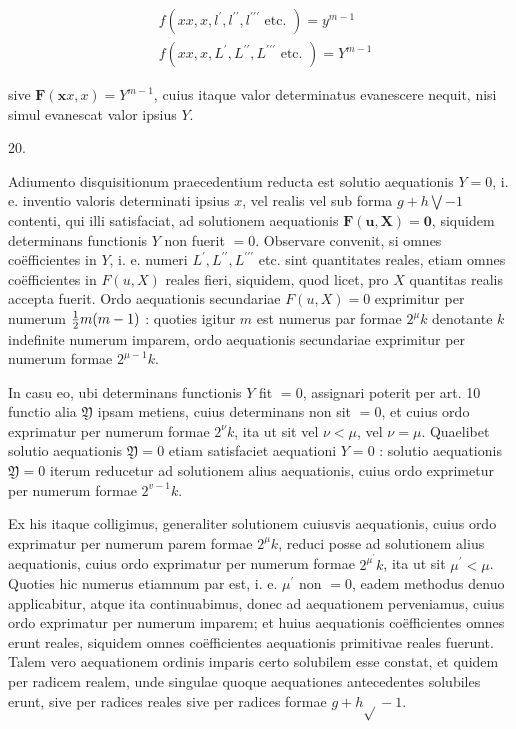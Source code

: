 \documentclass[twoside,12pt, showframe]{memoir}
\let\oldfrac\frac
\def\frac#1#2{\mathchoice{\tfrac{#1}{#2}}{\oldfrac{#1}{#2}}{\genfrac{}{}{}{2}{#1}{#2\mathstrut}}{\genfrac{}{}{}{3}{#1}{#2\mathstrut}}}
\begin{document}
\[
\begin{aligned}
& f\left(x x, x, l^{\prime}, l^{\prime \prime}, l^{\prime \prime \prime} \text { etc. }\right)=y^{m-1} \\
& f\left(x x, x, L^{\prime}, L^{\prime \prime}, L^{\prime \prime \prime} \text { etc. }\right)=Y^{m-1}
\end{aligned}
\]

sive \(\boldsymbol{F}(\boldsymbol{x} x, x)=Y^{m-1}\), cuius itaque valor determinatus evanescere nequit, nisi simul evanescat valor ipsius \(Y\).

20.

Adiumento disquisitionum praecedentium reducta est solutio aequationis \(Y=0\), i. e. inventio valoris determinati ipsius \(x\), vel realis vel sub forma \(g+h \bigvee-1\) contenti, qui illi satisfaciat, ad solutionem aequationis \(\boldsymbol{F}(\boldsymbol{u}, \mathbf{X})=\mathbf{0}\),
siquidem determinans functionis \(Y\) non fuerit \(=0\). Observare convenit, si omnes coëfficientes in \(Y\), i. e. numeri \(L^{\prime}, L^{\prime \prime}, L^{\prime \prime \prime}\) etc. sint quantitates reales, etiam omnes coëfficientes in \(F(u, X)\) reales fieri, siquidem, quod licet, pro \(X\) quantitas realis accepta fuerit. Ordo aequationis secundariae \(F(u, X)=0\) exprimitur per numerum \(\frac{1}{2} m(m-1)\) : quoties igitur \(m\) est numerus par formae \(2^{\mu} k\) denotante \(k\) indefinite numerum imparem, ordo aequationis secundariae exprimitur per numerum formae \(2^{\mu-1} k\).

In casu eo, ubi determinans functionis \(Y\) fit \(=0\), assignari poterit per art. 10 functio alia \(\mathfrak{Y}\) ipsam metiens, cuius determinans non sit \(=0\), et cuius ordo exprimatur per numerum formae \(2^{\nu} k\), ita ut sit vel \(\nu<\mu\), vel \(\nu=\mu\). Quaelibet solutio aequationis \(\mathfrak{Y}=0\) etiam satisfaciet aequationi \(Y=0\) : solutio aequationis \(\mathfrak{Y}=0\) iterum reducetur ad solutionem alius aequationis, cuius ordo exprimetur per numerum formae \(2^{v-1} k\).

Ex his itaque colligimus, generaliter solutionem cuiusvis aequationis, cuius ordo exprimatur per numerum parem formae \(2^{\mu} k\), reduci posse ad solutionem alius aequationis, cuius ordo exprimatur per numerum formae \(2^{\mu^{\prime}} k\), ita ut sit \(\mu^{\prime}<\mu\). Quoties hic numerus etiamnum par est, i. e. \(\mu^{\prime}\) non \(=0\), eadem methodus denuo applicabitur, atque ita continuabimus, donec ad aequationem perveniamus, cuius ordo exprimatur per numerum imparem; et huius aequationis coëfficientes omnes erunt reales, siquidem omnes coëfficientes aequationis primitivae reales fuerunt. Talem vero aequationem ordinis imparis certo solubilem esse constat, et quidem per radicem realem, unde singulae quoque aequationes antecedentes solubiles erunt, sive per radices reales sive per radices formae \(g+h \sqrt{ }-1\).
\end{document}
